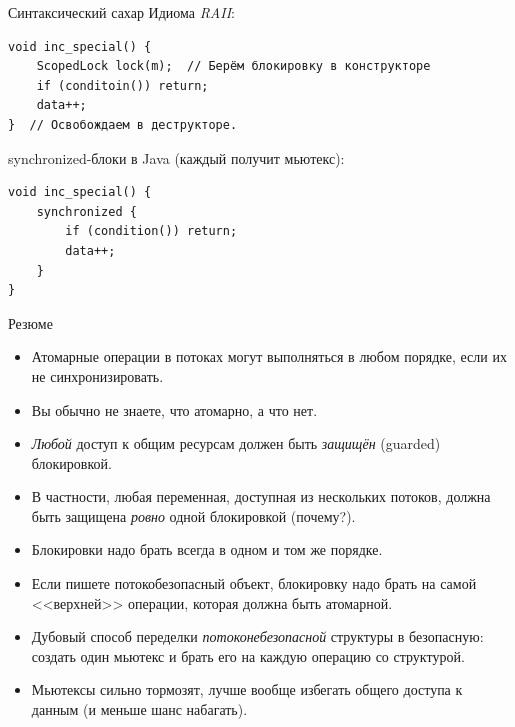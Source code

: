 \begin{frame}[fragile]{Синтаксический сахар}
	Идиома \textit{RAII}:
\begin{verbatim}
void inc_special() {
    ScopedLock lock(m);  // Берём блокировку в конструкторе
    if (conditoin()) return;
    data++;
}  // Освобождаем в деструкторе.
\end{verbatim}

	synchronized-блоки в Java (каждый получит мьютекс):
\begin{verbatim}
void inc_special() {
    synchronized {
        if (condition()) return;
        data++;
    }
}
\end{verbatim}
\end{frame}

\begin{frame}{Резюме}
	\begin{itemize}
		\item Атомарные операции в потоках могут выполняться в любом порядке, если их не синхронизировать.
		\item Вы обычно не знаете, что атомарно, а что нет.
		\item \textit{Любой} доступ к общим ресурсам должен быть \textit{защищён} (guarded) блокировкой.
		\item В частности, любая переменная, доступная из нескольких потоков, должна быть защищена \textit{ровно} одной блокировкой (почему?).
		\item Блокировки надо брать всегда в одном и том же порядке.
		\item Если пишете потокобезопасный объект, блокировку надо брать на самой <<верхней>> операции, которая должна быть атомарной.
		\item Дубовый способ переделки \textit{потоконебезопасной} структуры в безопасную: создать один мьютекс и брать его на каждую операцию со структурой.
		\item Мьютексы сильно тормозят, лучше вообще избегать общего доступа к данным (и меньше шанс набагать).
	\end{itemize}
\end{frame}
